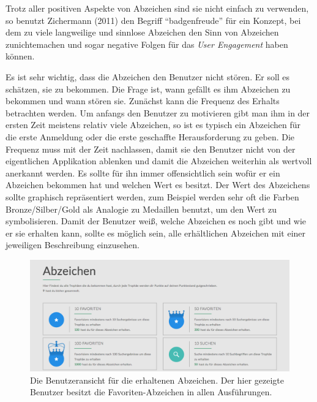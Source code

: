 \documentclass[12pt,twoside]{book}
\begin{document}
Trotz aller positiven Aspekte von Abzeichen sind sie nicht einfach zu verwenden, so benutzt Zichermann (2011) \citep[pp. 56]{zichermann2011gamification} den Begriff ``badgenfreude'' für ein Konzept, bei dem zu viele langweilige und sinnlose Abzeichen den Sinn von Abzeichen zunichtemachen und sogar negative Folgen für das \textit{User Engagement} haben können.

Es ist sehr wichtig, dass die Abzeichen den Benutzer nicht stören. Er soll es schätzen, sie zu bekommen. Die Frage ist, wann gefällt es ihm Abzeichen zu bekommen und wann stören sie.
Zunächst kann die Frequenz des Erhalts betrachten werden. Um anfangs den Benutzer zu motivieren gibt man ihm in der ersten Zeit meistens relativ viele Abzeichen, so ist es typisch ein Abzeichen für die erste Anmeldung oder die erste geschaffte Herausforderung zu geben.
Die Frequenz muss mit der Zeit nachlassen, damit sie den Benutzer nicht von der eigentlichen Applikation ablenken und damit die Abzeichen weiterhin als wertvoll anerkannt werden.
Es sollte für ihn immer offensichtlich sein wofür er ein Abzeichen bekommen hat und welchen Wert es besitzt. Der Wert des Abzeichens sollte graphisch repräsentiert werden, zum Beispiel werden sehr oft die Farben Bronze/Silber/Gold als Analogie zu Medaillen benutzt, um den Wert zu symbolisieren.
Damit der Benutzer weiß, welche Abzeichen es noch gibt und wie er sie erhalten kann, sollte es möglich sein, alle erhältlichen Abzeichen mit einer jeweiligen Beschreibung einzusehen.

\begin{figure}[htbp]
    \centering
    \includegraphics[width=1.0\textwidth]{images/infoboard_badges.png}
    \caption{Die Benutzeransicht für die erhaltenen Abzeichen. Der hier gezeigte Benutzer besitzt die Favoriten-Abzeichen in allen Ausführungen.}
    \label{fig:badges}
\end{figure}
\end{document}
